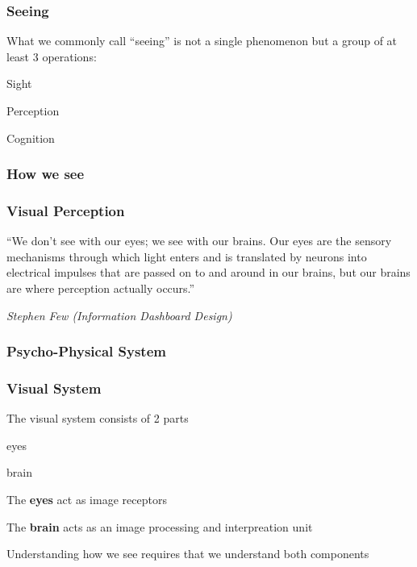 \documentclass[12pt]{beamer}\usepackage[]{graphicx}\usepackage[]{color}
\begin{document}

\begin{frame}
\frametitle{Seeing}

What we commonly call ``seeing'' is not a single phenomenon but a group of
at least 3 operations:
\bi
  \item Sight
  \item Perception
  \item Cognition
\ei
\eb

\end{frame}


\begin{frame}
\frametitle{How we see}
\begin{center}
\end{center}
\end{frame}


\begin{frame}
\frametitle{Visual Perception}

``We don't see with our eyes; we see with our brains. Our eyes are the sensory
mechanisms through which light enters and is translated by neurons into
electrical impulses that are passed on to and around in our brains, but our
brains are where perception actually occurs.''
\eb

\textit{Stephen Few (Information Dashboard Design)}

\end{frame}


\begin{frame}
\frametitle{Psycho-Physical System}
\begin{center}
\end{center}
\end{frame}


\begin{frame}
\frametitle{Visual System}

\bbi
  \item The visual system consists of 2 parts
  \bi
    \item eyes
    \item brain
  \ei
  \item The \textbf{eyes} act as image receptors
  \item The \textbf{brain} acts as an image processing and interpreation unit
  \item Understanding how we see requires that we understand both components
\ei

\end{frame}
\end{document}
